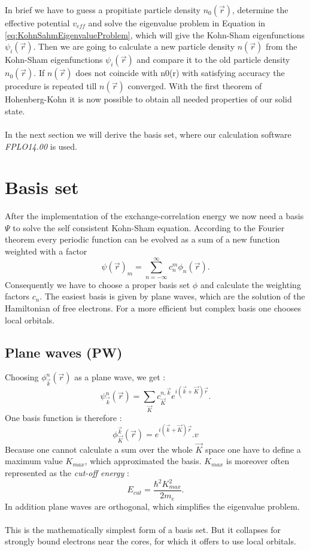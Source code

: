 		In brief we have to guess a propitiate particle density $n_0(\vec r)$, determine the effective potential $v_{eff}$ and solve the eigenvalue problem in Equation in \ref{eq:KohnSahmEigenvalueProblem}, which will give the Kohn-Sham eigenfunctions $\psi_i(\vec r)$. Then we are going to calculate a new particle density $n(\vec r)$ from the Kohn-Sham eigenfunctions $\psi_i(\vec r)$ and compare it to the old particle density $n_0 (\vec r)$. If $n(\vec r)$ does not coincide with n0(r) with satisfying accuracy the procedure is repeated till $n(\vec r)$ converged. With the first theorem of Hohenberg-Kohn it is now possible to obtain all needed properties of our solid state. \\\\
		In the next section we will derive the basis set, where our calculation software \textit{FPLO14.00} is used. 
		
		
	\section{Basis set}
		After the implementation of the exchange-correlation energy we now need a basis $\Psi$ to solve the self consistent Kohn-Sham equation. According to the Fourier theorem every periodic function can be evolved as a sum of a new function weighted with a factor
		\begin{equation}
			\psi(\vec r)_m = \sum_{n=-\infty}^{\infty} c_n^m \phi_n(\vec r).
		\end{equation}
		Consequently we have to choose a proper basis set $\phi$ and calculate the weighting factors $c_n$. The easiest basis is given by plane waves, which are the solution of the Hamiltonian of free electrons. For a more efficient but complex basis one chooses local orbitals.
		
		
		\subsection{Plane waves (PW)}
			Choosing $\phi_\vec k^n(\vec r)$ as a plane wave, we get :
			\begin{equation}
				\psi_\vec k^n(\vec r) = \sum_{\vec K} c_\vec K^{n, \vec k} e^{i(\vec k + \vec K)\vec r}.
			\end{equation}
			One basis function is therefore :
			\begin{equation}
				\phi_\vec K^\vec k (\vec r) = e^{i(\vec k + \vec K) \vec r}.
v			\end{equation}
			Because one cannot calculate a sum over the whole $\vec K$ space one have to define a maximum value $K_{max}$, which approximated the basis. $K_{max}$ is moreover often represented as the \textit{cut-off energy} :
			\begin{equation}
				E_{cut} = \frac{\hbar^2 K_{max}^2}{2m_e}.
			\end{equation}
			In addition plane waves are orthogonal, which simplifies the eigenvalue problem. \\\\
			This is the mathematically simplest form of a basis set. But it collapses for strongly bound electrons near the cores, for which it offers to use local orbitals.
			
